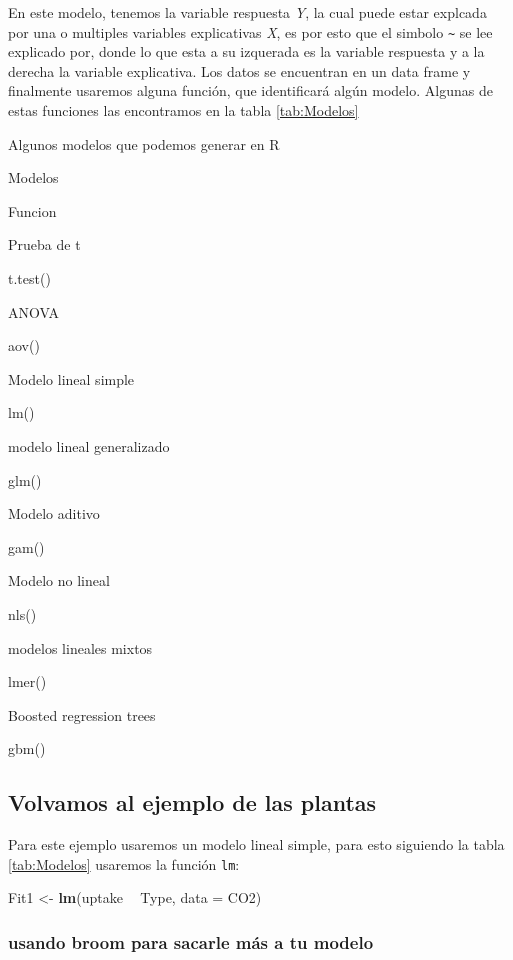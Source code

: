 \documentclass[]{book}
\newenvironment{Shaded}{\begin{snugshade}}{\end{snugshade}}
\newcommand{\DataTypeTok}[1]{\textcolor[rgb]{0.13,0.29,0.53}{#1}}
\newcommand{\KeywordTok}[1]{\textcolor[rgb]{0.13,0.29,0.53}{\textbf{#1}}}
\newcommand{\NormalTok}[1]{#1}
\newcommand{\OperatorTok}[1]{\textcolor[rgb]{0.81,0.36,0.00}{\textbf{#1}}}
\newcommand{\StringTok}[1]{\textcolor[rgb]{0.31,0.60,0.02}{#1}}
\begin{document}
En este modelo, tenemos la variable respuesta \emph{Y}, la cual puede
estar explcada por una o multiples variables explicativas \emph{X}, es
por esto que el simbolo \texttt{\textasciitilde{}} se lee explicado por,
donde lo que esta a su izquerada es la variable respuesta y a la derecha
la variable explicativa. Los datos se encuentran en un data frame y
finalmente usaremos alguna función, que identificará algún modelo.
Algunas de estas funciones las encontramos en la tabla \ref{tab:Modelos}

\label{tab:Modelos}Algunos modelos que podemos generar en R

Modelos

Funcion

Prueba de t

t.test()

ANOVA

aov()

Modelo lineal simple

lm()

modelo lineal generalizado

glm()

Modelo aditivo

gam()

Modelo no lineal

nls()

modelos lineales mixtos

lmer()

Boosted regression trees

gbm()

\hypertarget{volvamos-al-ejemplo-de-las-plantas}{%
\subsection{Volvamos al ejemplo de las
plantas}\label{volvamos-al-ejemplo-de-las-plantas}}

Para este ejemplo usaremos un modelo lineal simple, para esto siguiendo
la tabla \ref{tab:Modelos} usaremos la función \texttt{lm}:

\begin{Shaded}
\begin{Highlighting}[]
\NormalTok{Fit1 <-}\StringTok{ }\KeywordTok{lm}\NormalTok{(uptake }\OperatorTok{~}\StringTok{ }\NormalTok{Type, }\DataTypeTok{data =}\NormalTok{ CO2)}
\end{Highlighting}
\end{Shaded}

\hypertarget{usando-broom-para-sacarle-mas-a-tu-modelo}{%
\subsubsection{usando broom para sacarle más a tu
modelo}\label{usando-broom-para-sacarle-mas-a-tu-modelo}}
\end{document}
